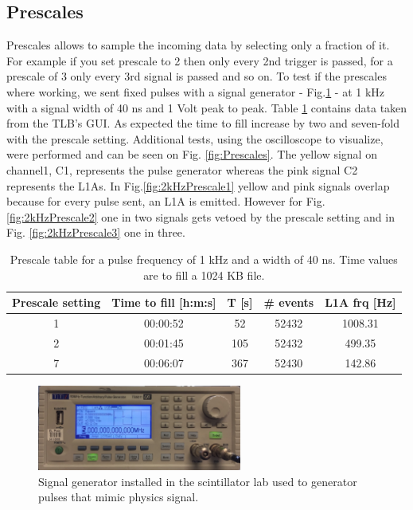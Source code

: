 \subsection{Prescales}
\label{Prescales}

Prescales allows to sample the incoming data by selecting only a fraction of it. For example if you set prescale to 2 then only every 2nd trigger is passed, for a prescale of 3 only every 3rd signal is passed and so on. To test if the prescales where working, we sent fixed pulses with a signal generator - Fig.\ref{fig:SignalGenerator} - at 1 kHz with a signal width of 40 ns and 1 Volt peak to peak. Table \ref{table:prescale} contains data taken from the TLB's GUI. As expected the time to fill increase by two and seven-fold with the prescale setting. Additional tests, using the oscilloscope to visualize, were performed and can be seen on Fig. \ref{fig:Prescales}. The yellow signal on channel1, C1, represents the pulse generator whereas the pink signal C2 represents the L1As. In  Fig.\ref{fig:2kHzPrescale1} yellow and pink signals overlap because for every pulse sent, an L1A is emitted. However for Fig.\ref{fig:2kHzPrescale2} one in two signals gets vetoed by the prescale setting and in Fig. \ref{fig:2kHzPrescale3} one in three.

\begin{table}[htbp!]
\caption{Prescale table for a pulse frequency of 1 kHz and a width of 40 ns. Time values are to fill a 1024 KB file.}
\centering
\label{table:prescale}
\begin{tabular}{c c c c c}
\toprule
Prescale setting & Time to fill [h:m:s] & T [s] & \# events & L1A frq [Hz] \\
\midrule
1 & 00:00:52 & 52 & 52432 & 1008.31 \\
2 & 00:01:45 & 105 & 52432 & 499.35 \\
7 & 00:06:07 & 367 & 52430 & 142.86 \\
\bottomrule
\end{tabular}
\end{table}


\begin{figure}[htbp!] 
\centering    
\includegraphics[width=0.6\textwidth]{SignalGenerator5Mhz.jpg}
\caption[Signal Generator]{Signal generator installed in the scintillator lab used to generator pulses that mimic physics signal.}
\label{fig:SignalGenerator}
\end{figure}

